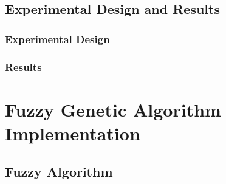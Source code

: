 \documentclass{beamer}
\begin{document}
\subsection{Experimental Design and Results}
\begin{frame}
  \frametitle{Experimental Design}

\end{frame}


\begin{frame}
  \frametitle{Results}

\end{frame}
\section[Fuzzy Genetic Algorithm Implementation]{Fuzzy Genetic Algorithm Implementation}

\subsection{Fuzzy Algorithm}
\end{document}
